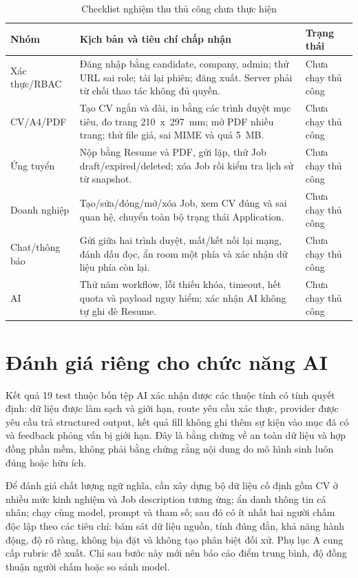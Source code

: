\begin{table}[H]
    \centering
    \footnotesize
    \begin{tabularx}{\textwidth}{|p{}|Y|p{0.19\textwidth}|} \hline
        \textbf{Nhóm} & \textbf{Kịch bản và tiêu chí chấp nhận} & \textbf{Trạng thái} \\ \hline
        Xác thực/RBAC & Đăng nhập bằng candidate, company, admin; thử URL sai role; tải lại phiên; đăng xuất. Server phải từ chối thao tác không đủ quyền. & Chưa chạy thủ công \\ \hline
        CV/A4/PDF & Tạo CV ngắn và dài, in bằng các trình duyệt mục tiêu, đo trang 210~x~297~mm; mở PDF nhiều trang; thử file giả, sai MIME và quá 5~MB. & Chưa chạy thủ công \\ \hline
        Ứng tuyển & Nộp bằng Resume và PDF, gửi lặp, thử Job draft/expired/deleted; xóa Job rồi kiểm tra lịch sử từ snapshot. & Chưa chạy thủ công \\ \hline
        Doanh nghiệp & Tạo/sửa/đóng/mở/xóa Job, xem CV đúng và sai quan hệ, chuyển toàn bộ trạng thái Application. & Chưa chạy thủ công \\ \hline
        Chat/thông báo & Gửi giữa hai trình duyệt, mất/kết nối lại mạng, đánh dấu đọc, ẩn room một phía và xác nhận dữ liệu phía còn lại. & Chưa chạy thủ công \\ \hline
        AI & Thử năm workflow, lỗi thiếu khóa, timeout, hết quota và payload nguy hiểm; xác nhận AI không tự ghi đè Resume. & Chưa chạy thủ công \\ \hline
    \end{tabularx}
    \caption{Checklist nghiệm thu thủ công chưa thực hiện}
    \label{tab:manual-checklist}
\end{table}

\section{Đánh giá riêng cho chức năng AI}

Kết quả 19 test thuộc bốn tệp AI xác nhận được các thuộc tính có tính quyết định: dữ liệu được làm sạch và giới hạn, route yêu cầu xác thực, provider được yêu cầu trả structured output, kết quả fill không ghi thêm sự kiện vào mục đã có và feedback phỏng vấn bị giới hạn. Đây là bằng chứng về an toàn dữ liệu và hợp đồng phần mềm, không phải bằng chứng rằng nội dung do mô hình sinh luôn đúng hoặc hữu ích.

Để đánh giá chất lượng ngữ nghĩa, cần xây dựng bộ dữ liệu cố định gồm CV ở nhiều mức kinh nghiệm và Job description tương ứng; ẩn danh thông tin cá nhân; chạy cùng model, prompt và tham số; sau đó có ít nhất hai người chấm độc lập theo các tiêu chí: bám sát dữ liệu nguồn, tính đúng đắn, khả năng hành động, độ rõ ràng, không bịa đặt và không tạo phân biệt đối xử. Phụ lục A cung cấp rubric đề xuất. Chỉ sau bước này mới nên báo cáo điểm trung bình, độ đồng thuận người chấm hoặc so sánh model.

